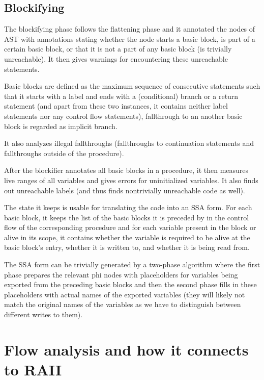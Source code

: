 \subsection{Blockifying}

The blockifying phase follows the flattening phase and it annotated the nodes of AST with annotations stating whether the node starts a basic block, is part of a certain basic block, or that it is not a part of any basic block (is trivially unreachable). It then gives warnings for encountering these unreachable statements.

Basic blocks are defined as the maximum sequence of consecutive statements such that it starts with a label and ends with a (conditional) branch or a return statement (and apart from these two instances, it contains neither label statements nor any control flow statements), fallthrough to an another basic block is regarded as implicit branch.

It also analyzes illegal fallthroughs (fallthroughs to continuation statements and fallthroughs outside of the procedure).

After the blockifier annotates all basic blocks in a procedure, it then measures live ranges of all variables and gives errors for uninitialized variables. It also finds out unreachable labels (and thus finds nontrivially unreachable code as well).

The state it keeps is usable for translating the code into an SSA form. For each basic block, it keeps the list of the basic blocks it is preceded by in the control flow of the corresponding procedure and for each variable present in the block or alive in its scope, it contains whether the variable is required to be alive at the basic block's entry, whether it is written to, and whether it is being read from.

The SSA form can be trivially generated by a two-phase algorithm where the first phase prepares the relevant phi nodes with placeholders for variables being exported from the preceding basic blocks and then the second phase fills in these placeholders with actual names of the exported variables (they will likely not match the original names of the variables as we have to distinguish between different writes to them).

\section{Flow analysis and how it connects to RAII}

